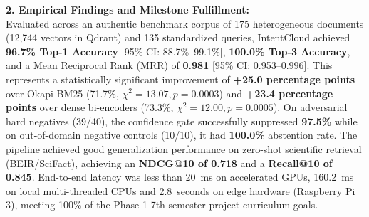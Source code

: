 \documentclass[a4paper,12pt]{article}
\begin{document}
\vspace{0.4em}
\noindent\textbf{2. Empirical Findings and Milestone Fulfillment:}\\
Evaluated across an authentic benchmark corpus of 175 heterogeneous documents (12,744 vectors in Qdrant) and 135 standardized queries, IntentCloud achieved \textbf{96.7\% Top-1 Accuracy} [95\% CI: 88.7\%--99.1\%], \textbf{100.0\% Top-3 Accuracy}, and a Mean Reciprocal Rank (MRR) of \textbf{0.981} [95\% CI: 0.953--0.996]. This represents a statistically significant improvement of \textbf{+25.0 percentage points} over Okapi BM25 (71.7\%, $\chi^2 = 13.07, p = 0.0003$) and \textbf{+23.4 percentage points} over dense bi-encoders (73.3\%, $\chi^2 = 12.00, p = 0.0005$). On adversarial hard negatives (39/40), the confidence gate successfully suppressed \textbf{97.5\%} while on out-of-domain negative controls (10/10), it had \textbf{100.0\%} abstention rate. The pipeline achieved good generalization performance on zero-shot scientific retrieval (BEIR/SciFact), achieving an \textbf{NDCG@10 of 0.718} and a \textbf{Recall@10 of 0.845}. End-to-end latency was less than 20~ms on accelerated GPUs, 160.2~ms on local multi-threaded CPUs and 2.8~seconds on edge hardware (Raspberry Pi 3), meeting 100\% of the Phase-1 7th semester project curriculum goals.
\end{document}
